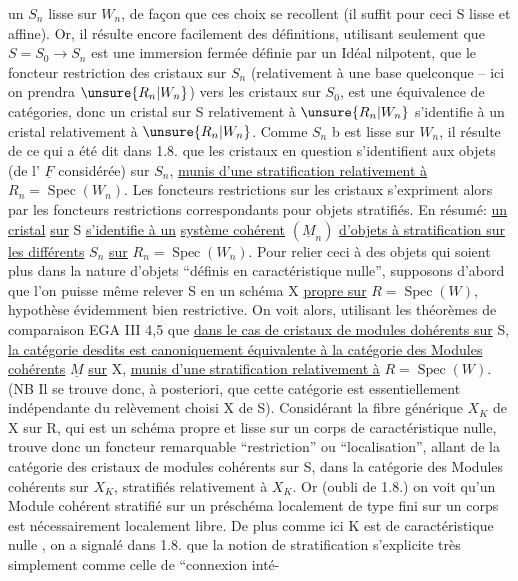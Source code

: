 
un $S_n$ lisse sur $W_n$, de façon que ces choix se recollent (il suffit pour ceci S lisse et affine). Or, il résulte encore facilement des définitions, utilisant seulement que $S=S_0\longrightarrow S_n$ est une immersion fermée définie par un Idéal nilpotent, que le foncteur restriction des cristaux sur $S_n$ (relativement à une base quelconque -- ici on prendra $\unsure{R_n|W_n}$) vers les cristaux sur $S_0$, est une équivalence de catégories, donc un cristal sur S relativement à $\unsure{R_n|W_n}$ s'identifie à un cristal  relativement à $\unsure{R_n|W_n}$. Comme $S_n$ b est lisse sur $W_n$, il résulte de ce qui a été dit dans 1.8. que les cristaux en question s'identifient aux objets (de l' $\underline F$ considérée) sur $S_n$, \uline{munis d'une stratification relativement à} $R_n=\operatorname{Spec}(W_n)$. Les foncteurs restrictions sur les cristaux s'expriment alors par les foncteurs restrictions correspondants pour objets stratifiés. En résumé: \uline{un cristal}  \uline{sur} S \uline{s'identifie à un}  \uline{système cohérent} $(\underline M_n)$ \uline{d'objets à stratification sur les différents} $S_n$ \uline{sur} $R_n=\operatorname{Spec}(W_n)$. Pour relier ceci à des objets qui soient plus dans la nature d'objets ``définis en caractéristique nulle'', supposons d'abord que l'on puisse même relever S en un schéma X \uline{propre sur} $R=\operatorname{Spec}(W)$, hypothèse évidemment bien restrictive. On voit alors, utilisant les théorèmes de comparaison EGA III 4,5 que \uline{dans le cas de cristaux de modules dohérents sur} S, \uline{la catégorie desdits est canoniquement équivalente à la catégorie des Modules cohérents} $\underline M$ \uline{sur} X, \uline{munis d'une stratification relativement à} $R=\operatorname{Spec}(W)$. (NB Il se trouve donc, à posteriori, que cette  catégorie est essentiellement indépendante du relèvement choisi X de S). Considérant la fibre générique $X_K$  de X sur R, qui est un schéma propre et lisse sur un corps de caractéristique nulle,  trouve donc un foncteur remarquable ``restriction'' ou ``localisation'', allant de la catégorie des cristaux de modules cohérents sur S, dans la catégorie des Modules cohérents  sur $X_K$, stratifiés relativement à $X_K$. Or (oubli de 1.8.) on voit  qu'un Module cohérent stratifié sur un préschéma localement de type fini sur un corps est nécessairement localement libre. De plus comme ici K est de caractéristique nulle , on a signalé dans 1.8. que la notion de stratification s'explicite très simplement comme celle de ``connexion inté-
